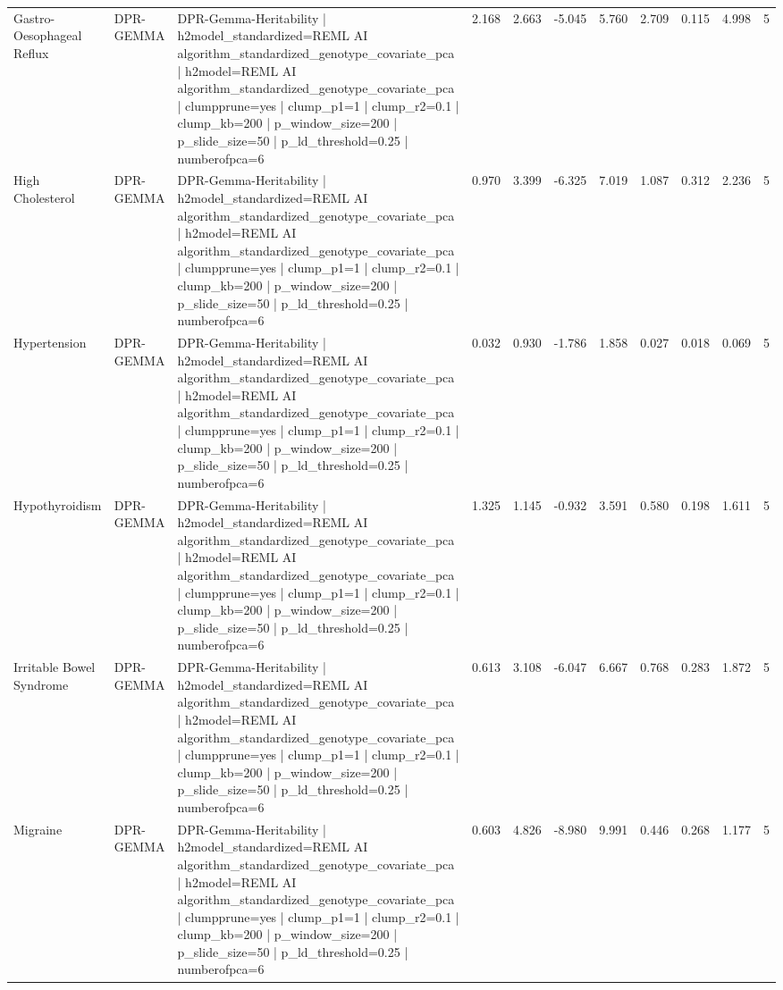 \begin{landscape}
\begin{longtable}{p{2.4cm}p{1.8cm}p{6.0cm}rrrrrrrr}
Gastro-Oesophageal Reflux & DPR-GEMMA & DPR-Gemma-Heritability | h2model\_standardized=REML AI algorithm\_standardized\_genotype\_covariate\_pca | h2model=REML AI algorithm\_standardized\_genotype\_covariate\_pca | clumpprune=yes | clump\_p1=1 | clump\_r2=0.1 | clump\_kb=200 | p\_window\_size=200 | p\_slide\_size=50 | p\_ld\_threshold=0.25 | numberofpca=6 & 2.168 & 2.663 & -5.045 & 5.760 & 2.709 & 0.115 & 4.998 & 5 \\
High Cholesterol & DPR-GEMMA & DPR-Gemma-Heritability | h2model\_standardized=REML AI algorithm\_standardized\_genotype\_covariate\_pca | h2model=REML AI algorithm\_standardized\_genotype\_covariate\_pca | clumpprune=yes | clump\_p1=1 | clump\_r2=0.1 | clump\_kb=200 | p\_window\_size=200 | p\_slide\_size=50 | p\_ld\_threshold=0.25 | numberofpca=6 & 0.970 & 3.399 & -6.325 & 7.019 & 1.087 & 0.312 & 2.236 & 5 \\
Hypertension & DPR-GEMMA & DPR-Gemma-Heritability | h2model\_standardized=REML AI algorithm\_standardized\_genotype\_covariate\_pca | h2model=REML AI algorithm\_standardized\_genotype\_covariate\_pca | clumpprune=yes | clump\_p1=1 | clump\_r2=0.1 | clump\_kb=200 | p\_window\_size=200 | p\_slide\_size=50 | p\_ld\_threshold=0.25 | numberofpca=6 & 0.032 & 0.930 & -1.786 & 1.858 & 0.027 & 0.018 & 0.069 & 5 \\
Hypothyroidism & DPR-GEMMA & DPR-Gemma-Heritability | h2model\_standardized=REML AI algorithm\_standardized\_genotype\_covariate\_pca | h2model=REML AI algorithm\_standardized\_genotype\_covariate\_pca | clumpprune=yes | clump\_p1=1 | clump\_r2=0.1 | clump\_kb=200 | p\_window\_size=200 | p\_slide\_size=50 | p\_ld\_threshold=0.25 | numberofpca=6 & 1.325 & 1.145 & -0.932 & 3.591 & 0.580 & 0.198 & 1.611 & 5 \\
Irritable Bowel Syndrome & DPR-GEMMA & DPR-Gemma-Heritability | h2model\_standardized=REML AI algorithm\_standardized\_genotype\_covariate\_pca | h2model=REML AI algorithm\_standardized\_genotype\_covariate\_pca | clumpprune=yes | clump\_p1=1 | clump\_r2=0.1 | clump\_kb=200 | p\_window\_size=200 | p\_slide\_size=50 | p\_ld\_threshold=0.25 | numberofpca=6 & 0.613 & 3.108 & -6.047 & 6.667 & 0.768 & 0.283 & 1.872 & 5 \\
Migraine & DPR-GEMMA & DPR-Gemma-Heritability | h2model\_standardized=REML AI algorithm\_standardized\_genotype\_covariate\_pca | h2model=REML AI algorithm\_standardized\_genotype\_covariate\_pca | clumpprune=yes | clump\_p1=1 | clump\_r2=0.1 | clump\_kb=200 | p\_window\_size=200 | p\_slide\_size=50 | p\_ld\_threshold=0.25 | numberofpca=6 & 0.603 & 4.826 & -8.980 & 9.991 & 0.446 & 0.268 & 1.177 & 5 \\

\end{longtable}
\end{landscape}
